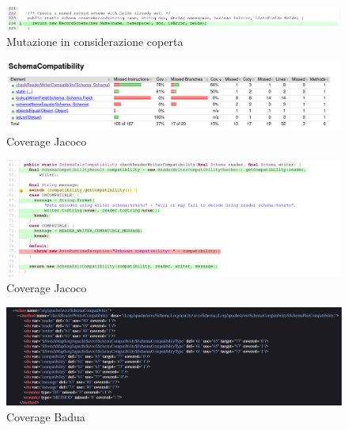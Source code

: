 \documentclass[10pt, a4paper]{article}
\begin{document}
  \begin{figure}
    \includegraphics[width=\linewidth]{./images/create_record/PitCoverage6.png}
    \caption{Mutazione in considerazione coperta}
    \label{fig:PitMutationCreateRecord6}
  \end{figure}

  \begin{figure}
    \includegraphics[width=\linewidth]{./images/schema_compatibiity/JacocoCoverage1.png}
    \caption{Coverage Jacoco}
    \label{fig:JacocoCoverageSchemaCompatibility1}
  \end{figure}

  \begin{figure}
    \includegraphics[width=\linewidth]{./images/schema_compatibiity/JacocoCoverage2.png}
    \caption{Coverage Jacoco}
    \label{fig:JacocoCoverageSchemaCompatibility2}
  \end{figure}

  \begin{figure}
    \includegraphics[width=\linewidth]{./images/schema_compatibiity/BaduaCoverage1.png}
    \caption{Coverage Badua}
    \label{fig:BaduaCoverageSchemaCompatibility1}
  \end{figure}
\end{document}

